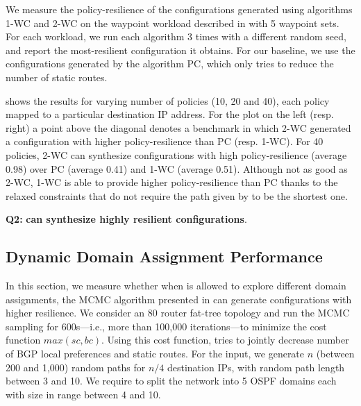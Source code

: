 We measure the policy-resilience of the configurations 
generated using algorithms  1-WC and 2-WC on the waypoint workload described in
 with 5 waypoint sets. 
For each workload, we run each algorithm 
3 times with a different random seed, and report the most-resilient configuration it obtains.
For our baseline, we use the configurations generated by the algorithm PC, which
only tries to reduce the number of static routes.

shows the results
for varying number of policies (10, 20 and 40), each policy mapped 
to a particular destination IP address. 
For the plot on the left (resp. right)
a point above the diagonal 
denotes a benchmark in which 2-WC
generated a configuration with higher policy-resilience than
PC (resp. 1-WC).
For 40 policies, 
2-WC can synthesize 
configurations with high policy-resilience
(average 0.98) over PC (average 0.41) and 1-WC (average 0.51). 
Although not as good as 2-WC, 1-WC is able to provide 
higher policy-resilience than
PC thanks to the relaxed constraints that do not require
the path given by \genesis to be the shortest one.

\textbf{Q2:} 
\textbf{\name can synthesize highly resilient configurations}.


\subsection{Dynamic Domain Assignment Performance} \label{sec:mcmceval}

In this section, we measure whether
when \name  is allowed to explore different domain assignments,
the MCMC algorithm presented in 
can 
generate configurations
with higher resilience. 
We consider an 80 router fat-tree topology and run the MCMC sampling
for 600s---i.e., more than 100,000 iterations---to minimize the
 cost function $max(sc, bc)$. Using this cost function, \name
 tries to jointly decrease number of 
 BGP local preferences and static routes. 
 For the input, we generate $n$ (between
200 and 1,000) random paths for $n/4$ destination IPs, with random
path length between 3 and 10.  We require \name to split the network
into 5 OSPF domains each with size in range between 4 and 10.

